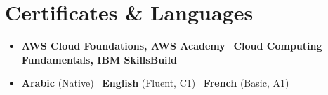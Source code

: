 \section{Certificates \& Languages}
\begin{itemize}[leftmargin=0.15in, label={}, itemsep=4pt, topsep=4pt]
  \small
  \item \textbf{AWS Cloud Foundations, AWS Academy} \textbar\ \textbf{Cloud Computing Fundamentals, IBM SkillsBuild}
  \item \textbf{Arabic} (Native) \textbar\ \textbf{English} (Fluent, C1) \textbar\ \textbf{French} (Basic, A1)
\end{itemize}